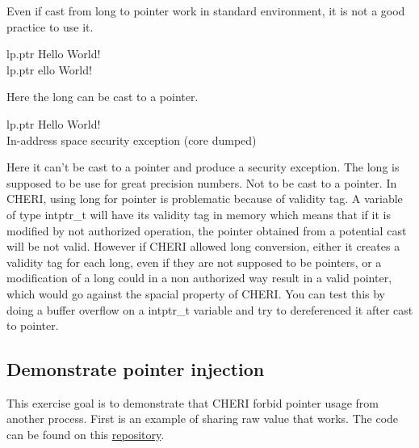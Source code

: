 \documentclass[a4paper, 11pt]{article}
\newcommand{\cmark}{\ding{51}}
\newcommand{\xmark}{\ding{55}}
\begin{document}
	
		Even if cast from long to pointer work in standard environment, it is not a good practice to use it.
		\begin{tcolorbox}[colback=gray!5!white, colframe=gray!75!black, title=Output on classic \Gls{risc-v} environment (No CHERI protection)]
			lp.ptr Hello World!\\
			lp.ptr ello World!
		\end{tcolorbox}
		Here the long can be cast to a pointer. 
		\begin{tcolorbox}[colback=gray!5!white, colframe=blue!75!black, title=Execution on CHERI environment]
			lp.ptr Hello World!\\
			In-address space security exception (core dumped)
		\end{tcolorbox}
		Here it can't be cast to a pointer and produce a security exception.
		The long is supposed to be use for great precision numbers. Not to be cast to a pointer.
		In CHERI, using long for pointer is problematic because of validity tag. A variable of type intptr\_t will have its validity tag in memory which means that if it is modified by not authorized operation, the pointer obtained from a potential cast will be not valid.
		However if CHERI allowed long conversion, either it creates a validity tag for each long, even if they are not supposed to be pointers, or a modification of a long could in a non authorized way result in a valid pointer, which would go against the spacial property of CHERI.
		You can test this by doing a buffer overflow on a intptr\_t variable and try to dereferenced it after cast to pointer.
	
	\subsection{Demonstrate pointer injection}
		This exercise goal is to demonstrate that CHERI forbid pointer usage from another process.
		First is an example of sharing raw value that works. The code can be found on this \href{https://ctsrd-cheri.github.io/cheri-exercises/exercises/pointer-injection/index.html}{repository}.
	
	
	
\end{document}
